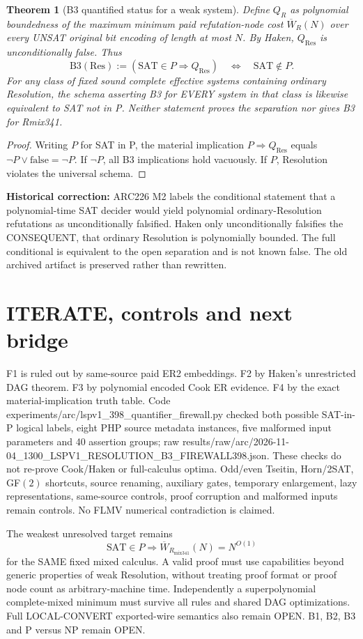 \documentclass[11pt]{article}
\newtheorem{theorem}{Theorem}
\begin{document}
\begin{theorem}[B3 quantified status for a weak system]
Define $Q_R$ as polynomial boundedness of the maximum minimum paid refutation-node cost $\overline W_R(N)$ over every UNSAT original bit encoding of length at most $N$. By Haken, $Q_{\mathrm{Res}}$ is unconditionally false. Thus
\[
\mathrm{B3}(\mathrm{Res}):=
(\mathrm{SAT}\in P\Rightarrow Q_{\mathrm{Res}})
\quad\Longleftrightarrow\quad \mathrm{SAT}\notin P.
\]
For any class of fixed sound complete effective systems containing ordinary Resolution, the schema asserting B3 for EVERY system in that class is likewise equivalent to SAT not in P. Neither statement proves the separation nor gives B3 for Rmix341.
\end{theorem}
\begin{proof}
Writing $P$ for SAT in P, the material implication $P\Rightarrow Q_{\mathrm{Res}}$ equals $\neg P\lor\mathrm{false}=\neg P$. If $\neg P$, all B3 implications hold vacuously. If $P$, Resolution violates the universal schema.
\end{proof}
\noindent\textbf{Historical correction:} ARC226 M2 labels the conditional statement that a polynomial-time SAT decider would yield polynomial ordinary-Resolution refutations as unconditionally falsified. Haken only unconditionally falsifies the CONSEQUENT, that ordinary Resolution is polynomially bounded. The full conditional is equivalent to the open separation and is not known false. The old archived artifact is preserved rather than rewritten.

\section*{ITERATE, controls and next bridge}
F1 is ruled out by same-source paid ER2 embeddings. F2 by Haken's unrestricted DAG theorem. F3 by polynomial encoded Cook ER evidence. F4 by the exact material-implication truth table. Code experiments/arc/lspv1_398_quantifier_firewall.py checked both possible SAT-in-P logical labels, eight PHP source metadata instances, five malformed input parameters and 40 assertion groups; raw results/raw/arc/2026-11-04_1300_LSPV1_RESOLUTION_B3_FIREWALL398.json. These checks do not re-prove Cook/Haken or full-calculus optima. Odd/even Tseitin, Horn/2SAT, GF$(2)$ shortcuts, source renaming, auxiliary gates, temporary enlargement, lazy representations, same-source controls, proof corruption and malformed inputs remain controls. No FLMV numerical contradiction is claimed.

\noindent The weakest unresolved target remains
\[
\mathrm{SAT}\in P\Longrightarrow
\overline W_{R_{\mathrm{mix341}}}(N)=N^{O(1)}
\]
for the SAME fixed mixed calculus. A valid proof must use capabilities beyond generic properties of weak Resolution, without treating proof format or proof node count as arbitrary-machine time. Independently a superpolynomial complete-mixed minimum must survive all rules and shared DAG optimizations. Full LOCAL-CONVERT exported-wire semantics also remain OPEN. B1, B2, B3 and P versus NP remain OPEN.
\end{document}
